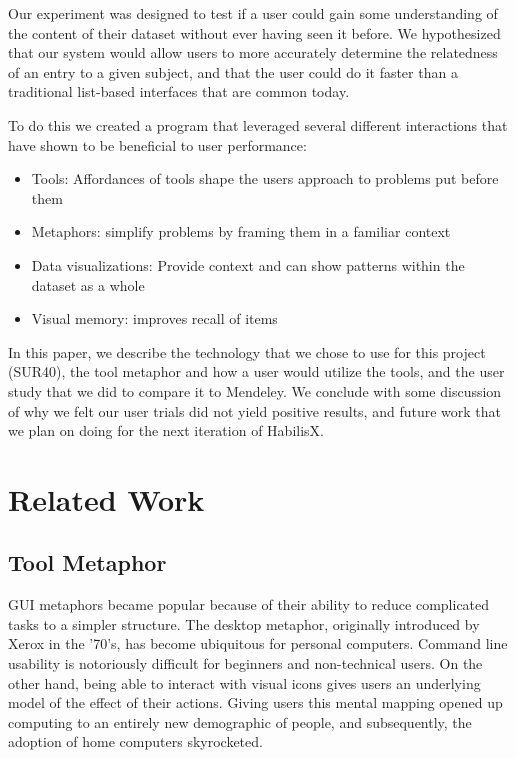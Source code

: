 \documentclass{article}
\begin{document}
Our experiment was designed to test if a user could gain some understanding of the content of their dataset without ever having seen it before.  We hypothesized that our system would allow users to more accurately determine the relatedness of an entry to a given subject, and that the user could do it faster than a traditional list-based interfaces that are common today.  

To do this we created a program that leveraged several different interactions that have shown to be beneficial to user performance:
\begin{itemize}
\item{Tools: Affordances of tools shape the users approach to problems put before them}
\item{Metaphors: simplify problems by framing them in a familiar context}
\item{Data visualizations: Provide context and can show patterns within the dataset as a whole}
\item{Visual memory: improves recall of items}
\end{itemize}

In this paper, we describe the technology that we chose to use for this project (SUR40), the tool metaphor and how a user would utilize the tools, and the user study that we did to compare it to Mendeley.  We conclude with some discussion of why we felt our user trials did not yield positive results, and future work that we plan on doing for the next iteration of HabilisX.


\section{Related Work} 
\subsection{Tool Metaphor}

GUI metaphors became popular because of their ability to reduce complicated tasks to a simpler structure.  %
The desktop metaphor, originally introduced by Xerox in the '70's, has become ubiquitous for personal computers.  Command line usability is notoriously difficult for beginners and non-technical users.  On the other hand, being able to interact with visual icons gives users an underlying model of the effect of their actions.  Giving users this mental mapping opened up computing to an entirely new demographic of people, and subsequently, the adoption of home computers skyrocketed.  
\end{document}
